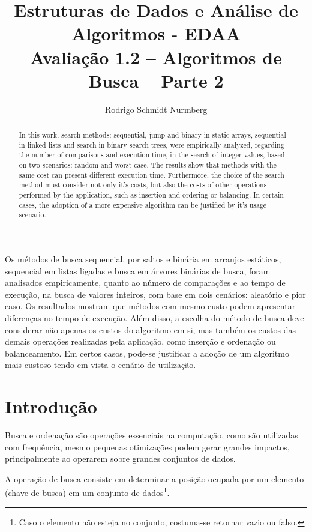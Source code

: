 \documentclass[12pt]{article}
\title{Estruturas de Dados e Análise de Algoritmos - EDAA\\ Avaliação 1.2 – Algoritmos de Busca – Parte 2}
\author{Rodrigo Schmidt Nurmberg\inst{1}}
\begin{document}
 

\maketitle

\begin{abstract}
In this work, search methods: sequential, jump and binary in static arrays, sequential in linked lists and search in binary search trees, were empirically analyzed, regarding the number of comparisons and execution time, in the search of integer values, based on two scenarios: random and worst case.
The results show that methods with the same cost can present different execution time. Furthermore, the choice of the search method must consider not only it's costs, but also the costs of other operations performed by the application, such as insertion and ordering or balancing. In certain cases, the adoption of a more expensive algorithm can be justified by it's usage scenario.
\end{abstract}

\begin{resumo}
Os métodos de busca sequencial, por saltos e binária em arranjos estáticos, sequencial em listas ligadas e busca em árvores binárias de busca, foram analisados empiricamente, quanto ao número de comparações e ao tempo de execução, na busca de valores inteiros, com base em dois cenários: aleatório e pior caso.
Os resultados mostram que métodos com mesmo custo podem apresentar diferenças no tempo de execução. Além disso, a escolha do método de busca deve considerar não apenas os custos do algoritmo em si, mas também os custos das demais operações realizadas pela aplicação, como inserção e ordenação ou balanceamento. Em certos casos, pode-se justificar a adoção de um algoritmo mais custoso tendo em vista o cenário de utilização. 
\end{resumo}

\section{Introdução}

Busca e ordenação são operações essenciais na computação, como são utilizadas com frequência, mesmo pequenas otimizações podem gerar grandes impactos, principalmente ao operarem sobre grandes conjuntos de dados.

A operação de busca consiste em determinar a posição ocupada por um elemento (chave de busca) em um conjunto de dados\footnote{Caso o elemento não esteja no conjunto, costuma-se retornar vazio ou falso.}.
\end{document}
